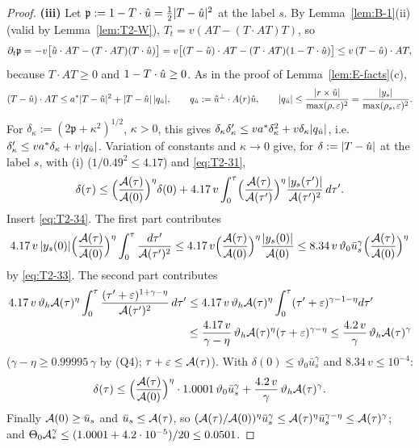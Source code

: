 \begin{proof}
\smallskip\textbf{(iii)} Let $\mathfrak p:=1-T\cdot\hat u=\frac12|T-\hat u|^2$ at the label $s$. By Lemma~\ref{lem:B-1}(ii) (valid by
Lemma~\ref{lem:T2-W}), $T_t=v(AT-(T\cdot AT)T)$, so
\[
\partial_t\mathfrak p=-v\bigl[\hat u\cdot AT-(T\cdot AT)(T\cdot\hat u)\bigr]
=v\bigl[(T-\hat u)\cdot AT-(T\cdot AT)(1-T\cdot\hat u)\bigr]\le v\,(T-\hat u)\cdot AT,
\]
because $T\cdot AT\ge0$ and $1-T\cdot\hat u\ge0$. As in the proof of Lemma~\ref{lem:E-facts}(c),
\[
(T-\hat u)\cdot AT\le a^*|T-\hat u|^2+|T-\hat u|\,|q_{\hat u}|,\qquad q_{\hat u}:=\hat u^\perp\cdot A(r)\hat u,\qquad
|q_{\hat u}|\le\frac{|r\times\hat u|}{\max(\rho,\varepsilon)^2}=\frac{|y_s|}{\max(\rho_s,\varepsilon)^2}.
\]
For $\delta_\kappa:=(2\mathfrak p+\kappa^2)^{1/2}$, $\kappa>0$, this gives
$\delta_\kappa\delta_\kappa'\le va^*\delta_\kappa^2+v\delta_\kappa|q_{\hat u}|$, i.e.\ $\delta_\kappa'\le va^*\delta_\kappa+v|q_{\hat u}|$.
Variation of constants and $\kappa\to0$ give, for $\delta:=|T-\hat u|$ at the label $s$, with (i) ($1/0.49^2\le4.17$) and
\eqref{eq:T2-31},
\[
\delta(\tau)\le\Bigl(\frac{\mathcal A(\tau)}{\mathcal A(0)}\Bigr)^{\eta}\delta(0)
+4.17\,v\int_0^\tau\Bigl(\frac{\mathcal A(\tau)}{\mathcal A(\tau')}\Bigr)^{\eta}\frac{|y_s(\tau')|}{\mathcal A(\tau')^2}\,d\tau' .
\]
Insert \eqref{eq:T2-34}. The first part contributes
\[
4.17\,v\,|y_s(0)|\Bigl(\frac{\mathcal A(\tau)}{\mathcal A(0)}\Bigr)^{\eta}\int_0^\tau\frac{d\tau'}{\mathcal A(\tau')^2}
\le4.17\,v\Bigl(\frac{\mathcal A(\tau)}{\mathcal A(0)}\Bigr)^{\eta}\frac{|y_s(0)|}{\mathcal A(0)}
\le8.34\,v\,\vartheta_0\bar u_s^\gamma\Bigl(\frac{\mathcal A(\tau)}{\mathcal A(0)}\Bigr)^{\eta}
\]
by \eqref{eq:T2-33}. The second part contributes
\begin{align*}
4.17\,v\,\vartheta_h\mathcal A(\tau)^\eta\int_0^\tau\frac{(\tau'+\varepsilon)^{1+\gamma-\eta}}{\mathcal A(\tau')^2}\,d\tau'
&\le4.17\,v\,\vartheta_h\mathcal A(\tau)^\eta\int_0^\tau(\tau'+\varepsilon)^{\gamma-1-\eta}d\tau'\\
&\le\frac{4.17\,v}{\gamma-\eta}\,\vartheta_h\mathcal A(\tau)^\eta(\tau+\varepsilon)^{\gamma-\eta}
\le\frac{4.2\,v}\gamma\,\vartheta_h\mathcal A(\tau)^\gamma
\end{align*}
($\gamma-\eta\ge0.99995\,\gamma$ by (Q4); $\tau+\varepsilon\le\mathcal A(\tau)$). With $\delta(0)\le\vartheta_0\bar u_s^\gamma$ and
$8.34\,v\le10^{-4}$:
\[
\delta(\tau)\le\Bigl(\frac{\mathcal A(\tau)}{\mathcal A(0)}\Bigr)^{\eta}\cdot1.0001\,\vartheta_0\bar u_s^\gamma
+\frac{4.2\,v}\gamma\,\vartheta_h\mathcal A(\tau)^\gamma .
\]
Finally $\mathcal A(0)\ge\bar u_s$ and $\bar u_s\le\mathcal A(\tau)$, so
$(\mathcal A(\tau)/\mathcal A(0))^\eta\bar u_s^\gamma\le\mathcal A(\tau)^\eta\bar u_s^{\gamma-\eta}\le\mathcal A(\tau)^\gamma$; and
$\Theta_0\mathcal A_*^\gamma\le(1.0001+4.2\cdot10^{-5})/20\le0.0501$.


\end{proof}
